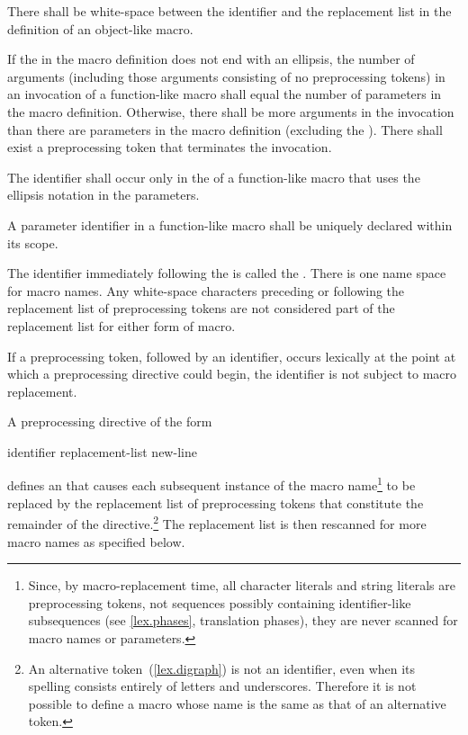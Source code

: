 \pnum
{}%
There shall be white-space between the identifier and the replacement list
in the definition of an object-like macro.

\pnum
If the  in the macro definition does not end with
an ellipsis, the number of arguments (including those arguments consisting
of no preprocessing tokens)
in an invocation of a function-like macro shall
equal the number of parameters in the macro definition. Otherwise, there shall be more arguments in the invocation than there are
parameters in the macro definition (excluding the ). There
shall exist a
\tcode{)}
preprocessing token that terminates the invocation.

\pnum
{}%
The identifier  shall occur only in the 
of a function-like macro that uses the ellipsis notation in the parameters.

\pnum
A parameter identifier in a function-like macro
shall be uniquely declared within its scope.

\pnum
The identifier immediately following the
is called the
%
%
.
There is one name space for macro names.
Any white-space characters preceding or following the
replacement list of preprocessing tokens are not considered
part of the replacement list for either form of macro.

\pnum
If a
\tcode{\#}
preprocessing token,
followed by an identifier,
occurs lexically
at the point at which a preprocessing directive could begin,
the identifier is not subject to macro replacement.

\pnum
A preprocessing directive of the form

\begin{ncsimplebnf}
 identifier replacement-list new-line
%
\end{ncsimplebnf}

defines an
%
 that
causes each subsequent instance of the macro name\footnote{Since, by macro-replacement time,
all character literals and string literals are preprocessing tokens,
not sequences possibly containing identifier-like subsequences
(see \ref{lex.phases}, translation phases),
they are never scanned for macro names or parameters.}
to be replaced by the replacement list of preprocessing tokens
that constitute the remainder of the directive.\footnote{An alternative token~(\ref{lex.digraph}) is not an identifier,
even when its spelling consists entirely of letters and underscores.
Therefore it is not possible to define a macro
whose name is the same as that of an alternative token.}
The replacement list is then rescanned for more macro names as
specified below.

